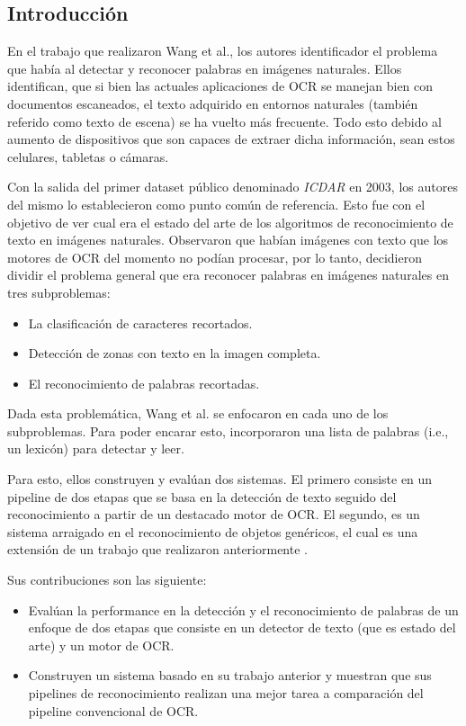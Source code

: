 \subsection{Introducción}

	En el trabajo que realizaron Wang et al., los autores identificador el problema que había al detectar y reconocer palabras en imágenes naturales. Ellos identifican, que si bien las actuales aplicaciones de OCR se manejan bien con documentos escaneados, el texto adquirido en entornos naturales (también referido como texto de escena) se ha vuelto más frecuente. Todo esto debido al aumento de dispositivos que son capaces de extraer dicha información, sean estos celulares, tabletas o cámaras.
	
	Con la salida del primer dataset público denominado \textit{ICDAR} en 2003, los autores del mismo lo establecieron como punto común de referencia. Esto fue con el objetivo de ver cual era el estado del arte de los algoritmos de reconocimiento de texto en imágenes naturales. Observaron que habían imágenes con texto que los motores de OCR del momento no podían procesar, por lo tanto, decidieron dividir el problema general que era reconocer palabras en imágenes naturales en tres subproblemas:
	\begin{itemize}
		\item La clasificación de caracteres recortados.
		\item Detección de zonas con texto en la imagen completa.
		\item El reconocimiento de palabras recortadas.
	\end{itemize}
	
	Dada esta problemática, Wang et al. se enfocaron en cada uno de los subproblemas. Para poder encarar esto, incorporaron una lista de palabras (i.e., un lexicón) para detectar y leer.
		
	Para esto, ellos construyen y evalúan dos sistemas. El primero consiste en un pipeline de dos etapas que se basa en la detección de texto seguido del reconocimiento a partir de un destacado motor de OCR. El segundo, es un sistema arraigado en el reconocimiento de objetos genéricos, el cual es una extensión de un trabajo que realizaron anteriormente \cite{WB10}.
	
	Sus contribuciones son las siguiente:
		\begin{itemize}
			\item Evalúan la performance en la detección y el reconocimiento de palabras de un enfoque de dos etapas que consiste en un detector de texto (que es estado del arte) y un motor de OCR.
			\item Construyen un sistema basado en su trabajo anterior \cite{WB10} y muestran que sus pipelines de reconocimiento realizan una mejor tarea a comparación del pipeline convencional de OCR.
		\end{itemize}